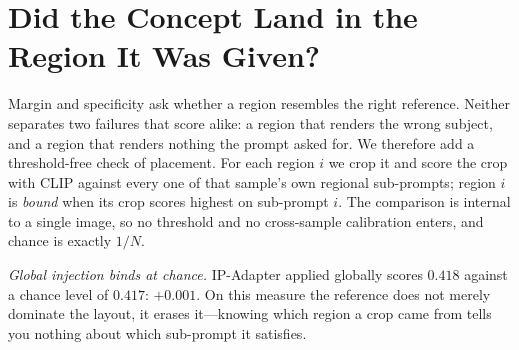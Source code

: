 \documentclass[review,10pt,times]{elsarticle}
\begin{document}
\section{Did the Concept Land in the Region It Was Given?}
\label{sec:binding}

Margin and specificity ask whether a region resembles the right reference.
Neither separates two failures that score alike: a region that renders the
wrong subject, and a region that renders nothing the prompt asked for.  We
therefore add a threshold-free check of placement.  For each region $i$ we
crop it and score the crop with CLIP against every one of that sample's own
regional sub-prompts; region $i$ is \emph{bound} when its crop scores highest
on sub-prompt $i$.  The comparison is internal to a single image, so no
threshold and no cross-sample calibration enters, and chance is exactly
$1/N$.

\begin{table}[htbp]
\centering
\caption{%
  \textbf{Region-level text-binding accuracy.}  Fraction of regions whose crop
  matches its own sub-prompt better than any sibling sub-prompt.  Chance is
  $1/N$: $0.50$ at $N{=}2$, $0.33$ at $N{=}3$.  ``$-$chance'' subtracts the
  per-sample chance level.  Significance is against Ours, paired over the same
  150 samples.%
}
\label{tab:binding}
\end{table}

\noindent\textit{Global injection binds at chance.}
IP-Adapter applied globally scores $0.418$ against a chance level of $0.417$:
$+0.001$.  On this measure the reference does not merely dominate the
layout, it erases it---knowing which region a crop came from tells you
nothing about which sub-prompt it satisfies.
\end{document}
